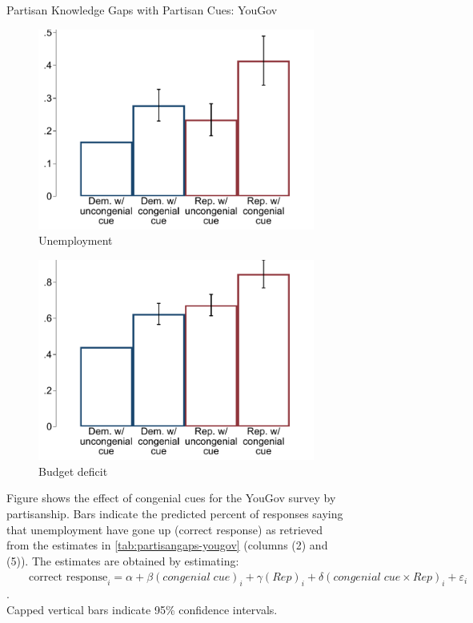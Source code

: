 \documentclass[12pt, letterpaper]{article}
\begin{document}
\begin{figure}[ht]
	\caption{Partisan Knowledge Gaps with Partisan Cues: YouGov}	
	\centering
	\begin{subfigure}{.495\textwidth}\centering
		\includegraphics[width=\textwidth]{../figs/yougov-unemp-congenialcue-partisan.pdf}
		\caption{Unemployment}
	\end{subfigure}
	\hfil
	\begin{subfigure}{.495\textwidth}\centering
		\includegraphics[width=\textwidth]{../figs/yougov-deficit-congenialcue-partisan.pdf}
		\caption{Budget deficit}
	\end{subfigure}	
	\caption*{\footnotesize Figure shows the effect of congenial cues for the YouGov survey by partisanship. Bars indicate the predicted percent of responses saying that unemployment have gone up (correct response) as retrieved from the estimates in \cref{tab:partisangaps-yougov} (columns (2) and (5)).  The estimates are obtained by estimating:\\
		
	$\qquad\text{correct response}_{i} = \alpha + \beta (congenial \; cue)_i + \gamma (Rep)_i + \delta (congenial\; cue \times Rep)_i + \varepsilon_{i}$.\\
	
	Capped vertical bars indicate 95\% confidence intervals.
	}
	\label{fig:yougov-reg-by-partisanship}
\end{figure}
\end{document}
